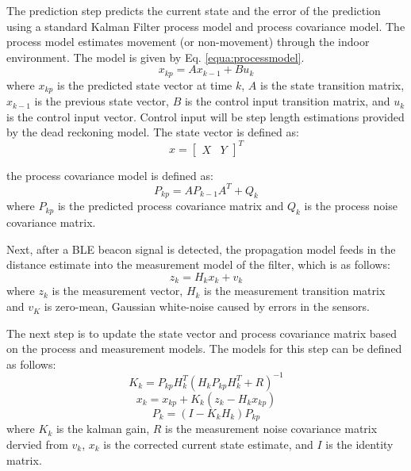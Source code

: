 \documentclass[conference]{IEEEtran}
\begin{document}
The prediction step predicts the current state and the error of the prediction using a standard Kalman Filter process model and process covariance model. The process model estimates movement (or non-movement) through the indoor environment. The model is given by Eq. \ref{equa:processmodel}.
\begin{equation}
\label{equa:processmodel}
x_{kp} = Ax_{k-1} + Bu_k
\end{equation}
where $x_{kp}$ is the predicted state vector at time $k$, $A$ is the state transition matrix, $x_{k-1}$ is the previous state vector, $B$ is the control input transition matrix, and $u_k$ is the control input vector. Control input will be step length estimations provided by the dead reckoning model. The state vector is defined as:
\begin{equation}
\label{equa:statevector}
x =
\begin{bmatrix}
  X  & Y
\end{bmatrix}^T
\end{equation}

the process covariance model is defined as:
\begin{equation}
P_{kp} = AP_{k-1}A^T + Q_k
\end{equation}
where $P_{kp}$ is the predicted process covariance matrix and $Q_k$ is the process noise covariance matrix.

Next, after a BLE beacon signal is detected, the propagation model feeds in the distance estimate into the measurement model of the filter, which is as follows:
\begin{equation}
z_k = H_kx_{k} + v_k
\end{equation}
where $z_k$ is the measurement vector, $H_k$ is the measurement transition matrix and $v_K$ is zero-mean, Gaussian white-noise caused by errors in the sensors.

The next step is to update the state vector and process covariance matrix based on the process and measurement models. The models for this step can be defined as follows:
\begin{equation}
K_k = P_{kp}H_k^T(H_kP_{kp}H_k^T + R)^{-1}
\end{equation}
\begin{equation}
x_k = x_{kp} + K_k(z_k - H_kx_{kp})
\end{equation}
\begin{equation}
P_k = (I - K_kH_k)P_{kp}
\end{equation}
where $K_k$ is the kalman gain, $R$ is the measurement noise covariance matrix dervied from $v_k$, $x_k$ is the corrected current state estimate, and $I$ is the identity matrix.
\end{document}
